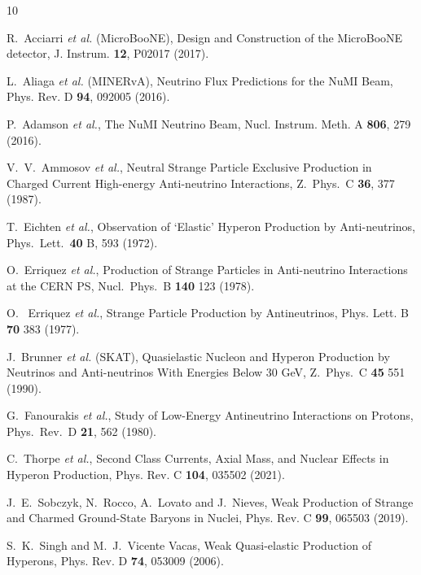 \documentclass[aps,prl,twocolumn,superscriptaddress]{revtex4}
\begin{document}
\begin{thebibliography}{10}

R.~Acciarri \textit{et al.} (MicroBooNE),
Design and Construction of the MicroBooNE detector,
J. Instrum. \textbf{12}, P02017 (2017).

L.~Aliaga \textit{et al.} (MINERvA),
Neutrino Flux Predictions for the NuMI Beam,
Phys. Rev. D \textbf{94}, 092005 (2016).

P.~Adamson \textit{et al.},
The NuMI Neutrino Beam,
Nucl. Instrum. Meth. A \textbf{806}, 279 (2016).

V.~V.~Ammosov {\it et al.},
Neutral Strange Particle Exclusive Production in Charged Current High-energy Anti-neutrino Interactions,
Z.\ Phys.\ C {\bf 36}, 377 (1987).
  
T.~Eichten {\it et al.},
Observation of `Elastic' Hyperon Production by Anti-neutrinos,
Phys.\ Lett.\  {\bf 40} B, 593 (1972).
  
O.~Erriquez {\it et al.},
Production of Strange Particles in Anti-neutrino Interactions at the CERN PS,
Nucl.\ Phys.\ B {\bf 140}  123 (1978).

O. ~Erriquez {\it et al.},
Strange Particle Production by Antineutrinos,
Phys. Lett. B {\bf 70} 383 (1977).
  
J.~Brunner {\it et al.} (SKAT),
Quasielastic Nucleon and Hyperon Production by Neutrinos and Anti-neutrinos With Energies Below 30 GeV,
Z.\ Phys.\ C {\bf 45} 551 (1990).

G.~Fanourakis {\it et al.},
Study of Low-Energy Antineutrino Interactions on Protons,
Phys.\ Rev.\ D {\bf 21}, 562 (1980).

C.~Thorpe \textit{et al.},
Second Class Currents, Axial Mass, and Nuclear Effects in Hyperon Production,
Phys. Rev. C \textbf{104}, 035502 (2021).

J.~E.~Sobczyk, N.~Rocco, A.~Lovato and J.~Nieves,
Weak Production of Strange and Charmed Ground-State Baryons in Nuclei,
Phys. Rev. C \textbf{99}, 065503 (2019).

S.~K.~Singh and M.~J.~Vicente Vacas,
Weak Quasi-elastic Production of Hyperons,
Phys. Rev. D \textbf{74}, 053009 (2006).


\end{thebibliography}
\end{document}
